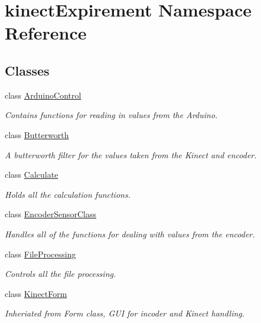 \hypertarget{namespacekinect_expirement}{}\section{kinect\+Expirement Namespace Reference}
\label{namespacekinect_expirement}
\subsection*{Classes}
\begin{DoxyCompactItemize}
\item 
class \hyperlink{classkinect_expirement_1_1_arduino_control}{Arduino\+Control}
\begin{DoxyCompactList}\small\item\em Contains functions for reading in values from the Arduino. \end{DoxyCompactList}\item 
class \hyperlink{classkinect_expirement_1_1_butterworth}{Butterworth}
\begin{DoxyCompactList}\small\item\em A butterworth filter for the values taken from the Kinect and encoder. \end{DoxyCompactList}\item 
class \hyperlink{classkinect_expirement_1_1_calculate}{Calculate}
\begin{DoxyCompactList}\small\item\em Holds all the calculation functions.\end{DoxyCompactList}\item 
class \hyperlink{classkinect_expirement_1_1_encoder_sensor_class}{Encoder\+Sensor\+Class}
\begin{DoxyCompactList}\small\item\em Handles all of the functions for dealing with values from the encoder. \end{DoxyCompactList}\item 
class \hyperlink{classkinect_expirement_1_1_file_processing}{File\+Processing}
\begin{DoxyCompactList}\small\item\em Controls all the file processing. \end{DoxyCompactList}\item 
class \hyperlink{classkinect_expirement_1_1_kinect_form}{Kinect\+Form}
\begin{DoxyCompactList}\small\item\em Inheriated from Form class, G\+UI for incoder and Kinect handling. \end{DoxyCompactList}\item 

\end{DoxyCompactItemize}
